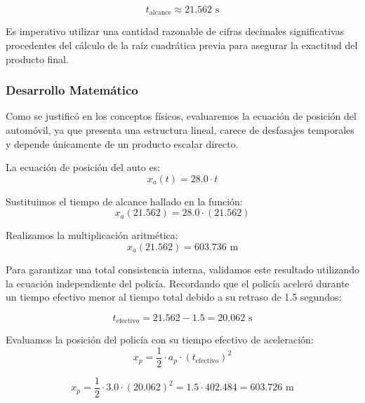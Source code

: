 \documentclass[12pt, a4paper]{article}
\begin{document}
\begin{equation}
t_{\text{alcance}} \approx 21.562 \text{ s}
\end{equation}

Es imperativo utilizar una cantidad razonable de cifras decimales significativas procedentes del cálculo de la raíz cuadrática previa para asegurar la exactitud del producto final.

\subsubsection*{Desarrollo Matemático}

Como se justificó en los conceptos físicos, evaluaremos la ecuación de posición del automóvil, ya que presenta una estructura lineal, carece de desfasajes temporales y depende únicamente de un producto escalar directo. 

La ecuación de posición del auto es:
\begin{equation}
x_a(t) = 28.0 \cdot t
\end{equation}

Sustituimos el tiempo de alcance hallado en la función:
\begin{equation}
x_a(21.562) = 28.0 \cdot (21.562)
\end{equation}

Realizamos la multiplicación aritmética:
\begin{equation}
x_a(21.562) = 603.736 \text{ m}
\end{equation}

Para garantizar una total consistencia interna, validamos este resultado utilizando la ecuación independiente del policía. Recordando que el policía aceleró durante un tiempo efectivo menor al tiempo total debido a su retraso de 1.5 segundos:

\begin{equation}
t_{\text{efectivo}} = 21.562 - 1.5 = 20.062 \text{ s}
\end{equation}

Evaluamos la posición del policía con su tiempo efectivo de aceleración:
\begin{equation}
x_p = \frac{1}{2} \cdot a_p \cdot (t_{\text{efectivo}})^2
\end{equation}

\begin{equation}
x_p = \frac{1}{2} \cdot 3.0 \cdot (20.062)^2 = 1.5 \cdot 402.484 = 603.726 \text{ m}
\end{equation}
\end{document}
